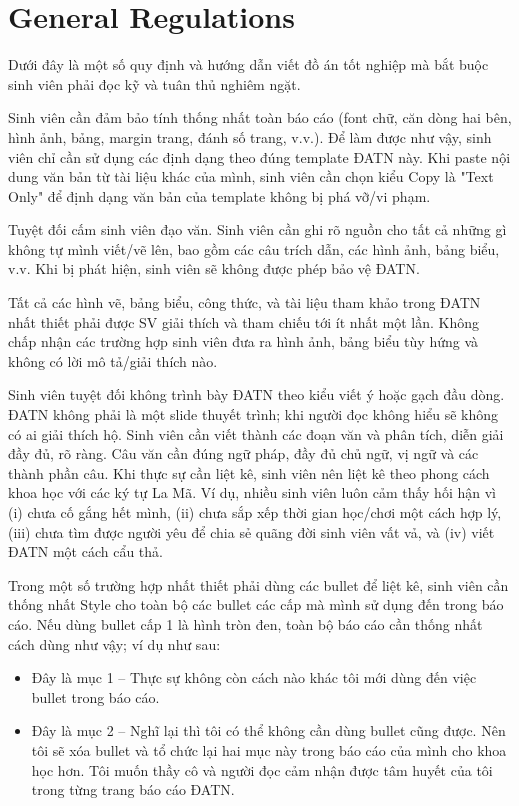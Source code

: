 \documentclass[../main.tex]{subfiles}
\begin{document}
\section{General Regulations}
Dưới đây là một số quy định và hướng dẫn viết đồ án tốt nghiệp mà bắt buộc sinh viên phải đọc kỹ và tuân thủ nghiêm ngặt.

Sinh viên cần đảm bảo tính thống nhất toàn báo cáo (font chữ, căn dòng hai bên, hình ảnh, bảng, margin trang, đánh số trang, v.v.). Để làm được như vậy, sinh viên chỉ cần sử dụng các định dạng theo đúng template ĐATN này. Khi paste nội dung văn bản từ tài liệu khác của mình, sinh viên cần chọn kiểu Copy là "Text Only" để định dạng văn bản của template không bị phá vỡ/vi phạm.

Tuyệt đối cấm sinh viên đạo văn. Sinh viên cần ghi rõ nguồn cho tất cả những gì không tự mình viết/vẽ lên, bao gồm các câu trích dẫn, các hình ảnh, bảng biểu, v.v. Khi bị phát hiện, sinh viên sẽ không được phép bảo vệ ĐATN.

Tất cả các hình vẽ, bảng biểu, công thức, và tài liệu tham khảo trong ĐATN nhất thiết phải được SV giải thích và tham chiếu tới ít nhất một lần. Không chấp nhận các trường hợp sinh viên đưa ra hình ảnh, bảng biểu tùy hứng và không có lời mô tả/giải thích nào.

Sinh viên tuyệt đối không trình bày ĐATN theo kiểu viết ý hoặc gạch đầu dòng. ĐATN không phải là một slide thuyết trình; khi người đọc không hiểu sẽ không có ai giải thích hộ. Sinh viên cần viết thành các đoạn văn và phân tích, diễn giải đầy đủ, rõ ràng. Câu văn cần đúng ngữ pháp, đầy đủ chủ ngữ, vị ngữ và các thành phần câu.
Khi thực sự cần liệt kê, sinh viên nên liệt kê theo phong cách khoa học với các ký tự La Mã. Ví dụ, nhiều sinh viên luôn cảm thấy hối hận vì (i) chưa cố gắng hết mình, (ii) chưa sắp xếp thời gian học/chơi một cách hợp lý, (iii) chưa tìm được người yêu để chia sẻ quãng đời sinh viên vất vả, và (iv) viết ĐATN một cách cẩu thả.

Trong một số trường hợp nhất thiết phải dùng các bullet để liệt kê, sinh viên cần thống nhất Style cho toàn bộ các bullet các cấp mà mình sử dụng đến trong báo cáo. Nếu dùng bullet cấp 1 là hình tròn đen, toàn bộ báo cáo cần thống nhất cách dùng như vậy; ví dụ như sau:

\begin{itemize}
\item Đây là mục 1 – Thực sự không còn cách nào khác tôi mới dùng đến việc bullet trong báo cáo.
\item Đây là mục 2 – Nghĩ lại thì tôi có thể không cần dùng bullet cũng được. Nên tôi sẽ xóa bullet và tổ chức lại hai mục này trong báo cáo của mình cho khoa học hơn. Tôi muốn thầy cô và người đọc cảm nhận được tâm huyết của tôi trong từng trang báo cáo ĐATN.
\end{itemize}
\end{document}
